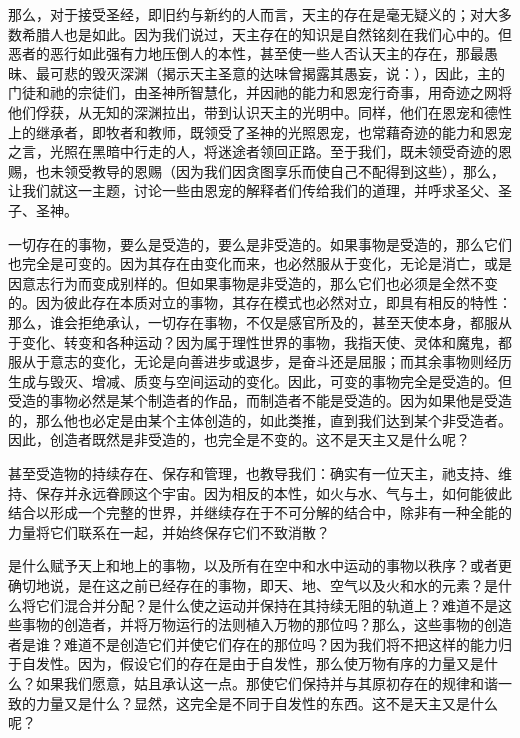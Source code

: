 那么，对于接受圣经，即旧约与新约的人而言，天主的存在是毫无疑义的；对大多数希腊人也是如此。因为我们说过，天主存在的知识是自然铭刻在我们心中的。但恶者的恶行如此强有力地压倒人的本性，甚至使一些人否认天主的存在，那最愚昧、最可悲的毁灭深渊（揭示天主圣意的达味曾揭露其愚妄，说：），因此，主的门徒和祂的宗徒们，由圣神所智慧化，并因祂的能力和恩宠行奇事，用奇迹之网将他们俘获，从无知的深渊拉出，带到认识天主的光明中。同样，他们在恩宠和德性上的继承者，即牧者和教师，既领受了圣神的光照恩宠，也常藉奇迹的能力和恩宠之言，光照在黑暗中行走的人，将迷途者领回正路。至于我们，既未领受奇迹的恩赐，也未领受教导的恩赐（因为我们因贪图享乐而使自己不配得到这些），那么，让我们就这一主题，讨论一些由恩宠的解释者们传给我们的道理，并呼求圣父、圣子、圣神。\par

一切存在的事物，要么是受造的，要么是非受造的。如果事物是受造的，那么它们也完全是可变的。因为其存在由变化而来，也必然服从于变化，无论是消亡，或是因意志行为而变成别样的。但如果事物是非受造的，那么它们也必须是全然不变的。因为彼此存在本质对立的事物，其存在模式也必然对立，即具有相反的特性：那么，谁会拒绝承认，一切存在事物，不仅是感官所及的，甚至天使本身，都服从于变化、转变和各种运动？因为属于理性世界的事物，我指天使、灵体和魔鬼，都服从于意志的变化，无论是向善进步或退步，是奋斗还是屈服；而其余事物则经历生成与毁灭、增减、质变与空间运动的变化。因此，可变的事物完全是受造的。但受造的事物必然是某个制造者的作品，而制造者不能是受造的。因为如果他是受造的，那么他也必定是由某个主体创造的，如此类推，直到我们达到某个非受造者。因此，创造者既然是非受造的，也完全是不变的。这不是天主又是什么呢？\par

甚至受造物的持续存在、保存和管理，也教导我们：确实有一位天主，祂支持、维持、保存并永远眷顾这个宇宙。因为相反的本性，如火与水、气与土，如何能彼此结合以形成一个完整的世界，并继续存在于不可分解的结合中，除非有一种全能的力量将它们联系在一起，并始终保存它们不致消散？\par

是什么赋予天上和地上的事物，以及所有在空中和水中运动的事物以秩序？或者更确切地说，是在这之前已经存在的事物，即天、地、空气以及火和水的元素？是什么将它们混合并分配？是什么使之运动并保持在其持续无阻的轨道上？难道不是这些事物的创造者，并将万物运行的法则植入万物的那位吗？那么，这些事物的创造者是谁？难道不是创造它们并使它们存在的那位吗？因为我们将不把这样的能力归于自发性。因为，假设它们的存在是由于自发性，那么使万物有序的力量又是什么？如果我们愿意，姑且承认这一点。那使它们保持并与其原初存在的规律和谐一致的力量又是什么？显然，这完全是不同于自发性的东西。这不是天主又是什么呢？\par


